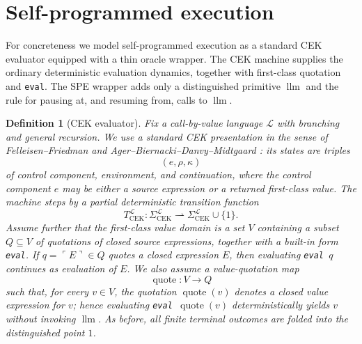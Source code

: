 \documentclass[11pt]{article}
\newtheorem{definition}{Definition}[section]
\newcommand{\quoteop}{\operatorname{quote}}
\newcommand{\llm}{\operatorname{llm}}
\begin{document}
\section{Self-programmed execution}

For concreteness we model self-programmed execution as a standard CEK evaluator equipped with a thin oracle wrapper. The CEK machine supplies the ordinary deterministic evaluation dynamics, together with first-class quotation and \texttt{eval}. The SPE wrapper adds only a distinguished primitive $\llm$ and the rule for pausing at, and resuming from, calls to $\llm$.

\begin{definition}[CEK evaluator]\label{def:cek}
Fix a call-by-value language $\mathcal{L}$ with branching and general recursion. We use a standard CEK presentation in the sense of Felleisen--Friedman and Ager--Biernacki--Danvy--Midtgaard \cite{FelleisenFriedman86,AgerEtAl03}: its states are triples
\[
(e,\rho,\kappa)
\]
of control component, environment, and continuation, where the control component $e$ may be either a source expression or a returned first-class value. The machine steps by a partial deterministic transition function
\[
T_{\mathrm{CEK}}^{\mathcal{L}}: \Sigma_{\mathrm{CEK}}^{\mathcal{L}} \rightharpoonup \Sigma_{\mathrm{CEK}}^{\mathcal{L}}\cup\{1\}.
\]
Assume further that the first-class value domain is a set $V$ containing a subset $Q\subseteq V$ of quotations of closed source expressions, together with a built-in form \texttt{eval}. If $q=\ulcorner E\urcorner\in Q$ quotes a closed expression $E$, then evaluating \texttt{eval} $\,q$ continues as evaluation of $E$. We also assume a value-quotation map
\[
\quoteop:V\to Q
\]
such that, for every $v\in V$, the quotation $\quoteop(v)$ denotes a closed value expression for $v$; hence evaluating \texttt{eval} $\,\quoteop(v)$ deterministically yields $v$ without invoking $\llm$. As before, all finite terminal outcomes are folded into the distinguished point $1$.
\end{definition}
\end{document}
